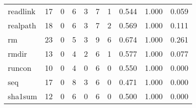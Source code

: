 \begin{longtable}{lp{2.0cm}p{2.0cm}p{2.0cm}p{2.0cm}p{2.0cm}p{2.0cm}p{2.0cm}p{2.0cm}p{2.0cm}}
readlink  &                     17 &                                             0 &                                            6 &                                           3 &                                            7 &                                          1 &                                0.544 &                                  1.000 &                                0.059 \\
realpath  &                     18 &                                             0 &                                            6 &                                           3 &                                            7 &                                          2 &                                0.569 &                                  1.000 &                                0.111 \\
rm        &                     23 &                                             0 &                                            5 &                                           3 &                                            9 &                                          6 &                                0.674 &                                  1.000 &                                0.261 \\
rmdir     &                     13 &                                             0 &                                            4 &                                           2 &                                            6 &                                          1 &                                0.577 &                                  1.000 &                                0.077 \\
runcon    &                     10 &                                             0 &                                            4 &                                           0 &                                            6 &                                          0 &                                0.550 &                                  1.000 &                                0.000 \\
seq       &                     17 &                                             0 &                                            8 &                                           3 &                                            6 &                                          0 &                                0.471 &                                  1.000 &                                0.000 \\
sha1sum   &                     12 &                                             0 &                                            6 &                                           0 &                                            6 &                                          0 &                                0.500 &                                  1.000 &                                0.000 \\

\end{longtable}
